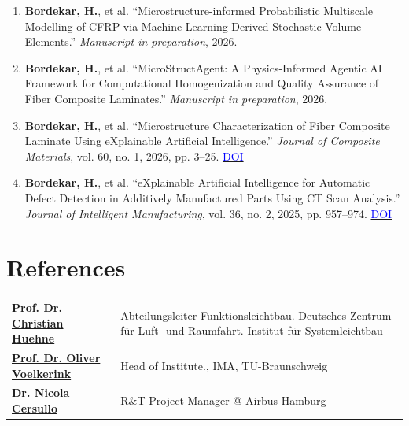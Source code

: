 \documentclass[a4paper,20pt]{article}
\begin{document}
\begin{enumerate}

  \item \textbf{Bordekar, H.}, et al.
  ``Microstructure-informed Probabilistic Multiscale Modelling of CFRP via Machine-Learning-Derived Stochastic Volume Elements.''
  \textit{Manuscript in preparation}, 2026.

  \item \textbf{Bordekar, H.}, et al.
  ``MicroStructAgent: A Physics-Informed Agentic AI Framework for Computational Homogenization and Quality Assurance of Fiber Composite Laminates.''
  \textit{Manuscript in preparation}, 2026.

  \item \textbf{Bordekar, H.}, et al.
  ``Microstructure Characterization of Fiber Composite Laminate Using eXplainable Artificial Intelligence.''
  \textit{Journal of Composite Materials}, vol. 60, no. 1, 2026, pp. 3--25.
  \href{https://journals.sagepub.com/doi/pdf/10.1177/00219983251345559}{\textcolor{blue}{DOI}}

  \item \textbf{Bordekar, H.}, et al.
  ``eXplainable Artificial Intelligence for Automatic Defect Detection in Additively Manufactured Parts Using CT Scan Analysis.''
  \textit{Journal of Intelligent Manufacturing}, vol. 36, no. 2, 2025, pp. 957--974.
  \href{https://link.springer.com/article/10.1007/s10845-023-02272-4}{\textcolor{blue}{DOI}}

\end{enumerate}
\vspace{2pt}

\section{\color{blue}References}

\begin{tabular}{@{} p{6cm} p{10cm}@{}}
\textbf{\href{https://www.dlr.de/de/sy/ueber-uns/abteilungen-dlr-sy/dlr-sy-funktionsleichtbau}{Prof. Dr. Christian Huehne}} & Abteilungsleiter Funktionsleichtbau. Deutsches Zentrum für Luft- und Raumfahrt. Institut für Systemleichtbau \\
\textbf{\href{https://www.tu-braunschweig.de/ima/team/head-of-institute/prof-dr-ing-oliver-voelkerink}{Prof. Dr. Oliver Voelkerink}} & Head of Institute., IMA, TU-Braunschweig\\
\textbf{\href{https://www.linkedin.com/in/nicola-cersullo-41772b131 }{Dr. Nicola Cersullo}} & R\&T Project Manager @ Airbus Hamburg \\
\end{tabular}
\end{document}
